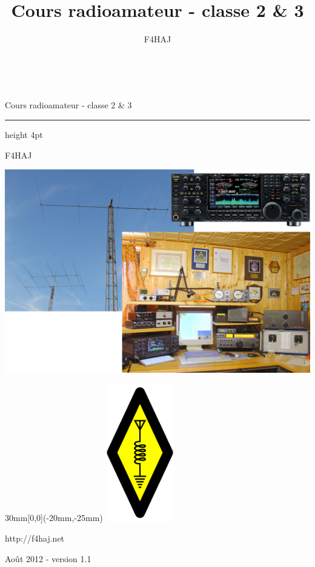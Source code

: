 \documentclass[a4paper,12pt,oneside]{report} %
\title{Cours radioamateur - classe 2 \& 3} %
\author{F4HAJ} %
\begin{document}
	
	\begin{titlepage}%
		\begin{center} 
			~
			\vfill
			\begin{flushleft}
				\huge Cours radioamateur - classe 2 \& 3
			\end{flushleft}
			\par
			\hrule height 4pt
			\par
			\begin{flushright}
				\Large F4HAJ
				\par
			\end{flushright}
			\vspace{2cm}
			\includegraphics[width=\textwidth]{./img/img_couverture.png} 
			\vfill
			\vfill
		\end{center}
			\begin{textblock*}{30mm}[0,0](-20mm,-25mm)
				\includegraphics[width=3cm]{./img/International_symbol.png} 
			\end{textblock*}
		\begin{center}
			http://f4haj.net
			
			Août 2012 - version 1.1
		\end{center} 
	\end{titlepage} 	
	
\end{document}
